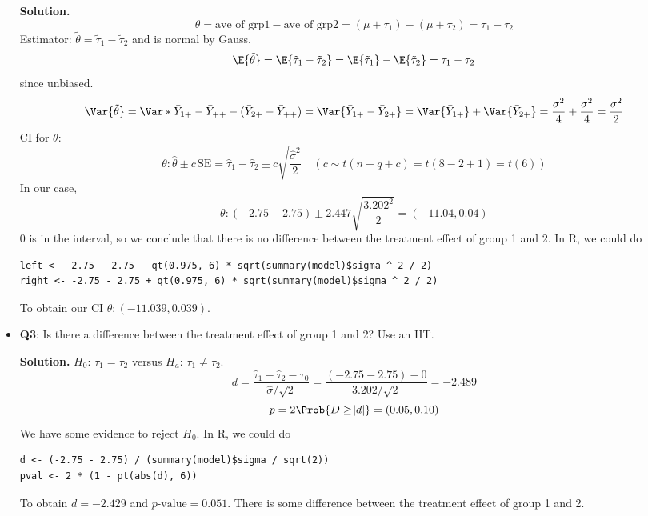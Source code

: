 \begin{Example}{}{}
\begin{itemize}
              \textbf{Solution.}
              \[ \theta=\text{ave of grp1}-\text{ave of grp2}=(\mu+\tau_1)-(\mu+\tau_2)=\tau_1-\tau_2 \]
              Estimator: $ \tilde{\theta}=\tilde{\tau}_1-\tilde{\tau}_2 $ and is normal by Gauss.
              \[ \E{\tilde{\theta}}=\E{\tilde{\tau}_1-\tilde{\tau}_2}=\E{\tilde{\tau}_1}-\E{\tilde{\tau}_2}=\tau_1-\tau_2 \]
              since unbiased.
              \[ \Var{\tilde{\theta}}
                  =\Var*{\bar{Y}_{1+}-\bar{Y}_{++}-(\bar{Y}_{2+}-\bar{Y}_{++})}
                  =\Var{\bar{Y}_{1+}-\bar{Y}_{2+}}
                  =\Var{\bar{Y}_{1+}}+\Var{\bar{Y}_{2+}}
                  =\frac{\sigma^2}{4} +\frac{\sigma^2}{4}
                  =\frac{\sigma^2}{2} \]
              CI for $ \theta $:
              \[ \theta:\hat{\theta}\pm c\,\text{SE}=\hat{\tau}_1-\hat{\tau}_2\pm
                  c\sqrt{\frac{\hat{\sigma}^2}{2}}\quad(c \sim t(n-q+c)=t(8-2+1)=t(6)) \]
              In our case,
              \[ \theta:(-2.75-2.75)\pm 2.447\sqrt{\frac{3.202^2}{2}}=(-11.04,0.04) \]
              $ 0 $ is in the interval, so we conclude that there is no difference
              between the treatment effect of group 1 and 2. In R, we could do
              \begin{verbatim}
left <- -2.75 - 2.75 - qt(0.975, 6) * sqrt(summary(model)$sigma ^ 2 / 2)
right <- -2.75 - 2.75 + qt(0.975, 6) * sqrt(summary(model)$sigma ^ 2 / 2)
\end{verbatim}
              To obtain our CI $ \theta:(-11.039, 0.039) $.
        \item \textbf{Q3}: Is there a difference between the treatment effect of group 1 and 2? Use an HT\@.

              \textbf{Solution.} $ H_0 $: $ \tau_1=\tau_2 $ versus $ H_a $: $ \tau_1\ne \tau_2 $.
              \[ d=\frac{\hat{\tau}_1-\hat{\tau}_2-\tau_0}{\hat{\sigma}/\sqrt{2}}=
                  \frac{(-2.75-2.75)-0}{3.202/\sqrt{2}}=-2.489 \]
              \[ p=2\Prob{D\ge \abs{d}}=(0.05,0.10) \]
              We have some evidence to reject $ H_0 $. In R, we could do
              \begin{verbatim}
d <- (-2.75 - 2.75) / (summary(model)$sigma / sqrt(2))
pval <- 2 * (1 - pt(abs(d), 6))
\end{verbatim}
              To obtain $ d=-2.429 $ and $ p\text{-value}=0.051 $. There is some difference
              between the treatment effect of group 1 and 2.
    \end{itemize}
\end{Example}
